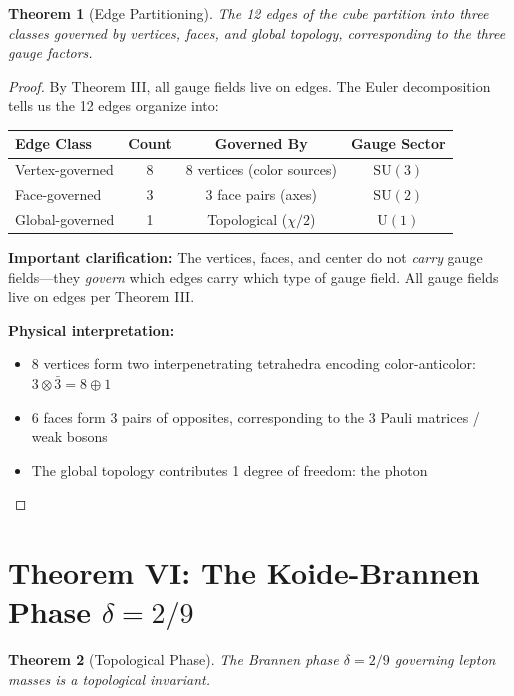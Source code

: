 \documentclass[11pt,a4paper]{article}
\theoremstyle{plain}
\newtheorem{theorem}{Theorem}[section]
\theoremstyle{definition}
\theoremstyle{remark}
\newcommand{\SUthree}{\text{SU}(3)}
\newcommand{\SUtwo}{\text{SU}(2)}
\newcommand{\Uone}{\text{U}(1)}
\begin{document}
\begin{theorem}[Edge Partitioning]
The 12 edges of the cube partition into three classes governed by vertices, faces, and global topology, corresponding to the three gauge factors.
\end{theorem}

\begin{proof}
By Theorem III, all gauge fields live on edges. The Euler decomposition tells us the 12 edges organize into:

\begin{center}
\begin{tabular}{lccc}
\toprule
\textbf{Edge Class} & \textbf{Count} & \textbf{Governed By} & \textbf{Gauge Sector} \\
\midrule
Vertex-governed & 8 & 8 vertices (color sources) & $\SUthree$ \\
Face-governed & 3 & 3 face pairs (axes) & $\SUtwo$ \\
Global-governed & 1 & Topological ($\chi/2$) & $\Uone$ \\
\bottomrule
\end{tabular}
\end{center}

\textbf{Important clarification:} The vertices, faces, and center do not \emph{carry} gauge fields---they \emph{govern} which edges carry which type of gauge field. All gauge fields live on edges per Theorem III.

\textbf{Physical interpretation:}
\begin{itemize}
  \item 8 vertices form two interpenetrating tetrahedra encoding color-anticolor: $3 \otimes \bar{3} = 8 \oplus 1$
  \item 6 faces form 3 pairs of opposites, corresponding to the 3 Pauli matrices / weak bosons
  \item The global topology contributes 1 degree of freedom: the photon
\end{itemize}
\end{proof}

\section{Theorem VI: The Koide-Brannen Phase $\delta = 2/9$}

\begin{theorem}[Topological Phase]
The Brannen phase $\delta = 2/9$ governing lepton masses is a topological invariant.
\end{theorem}
\end{document}
